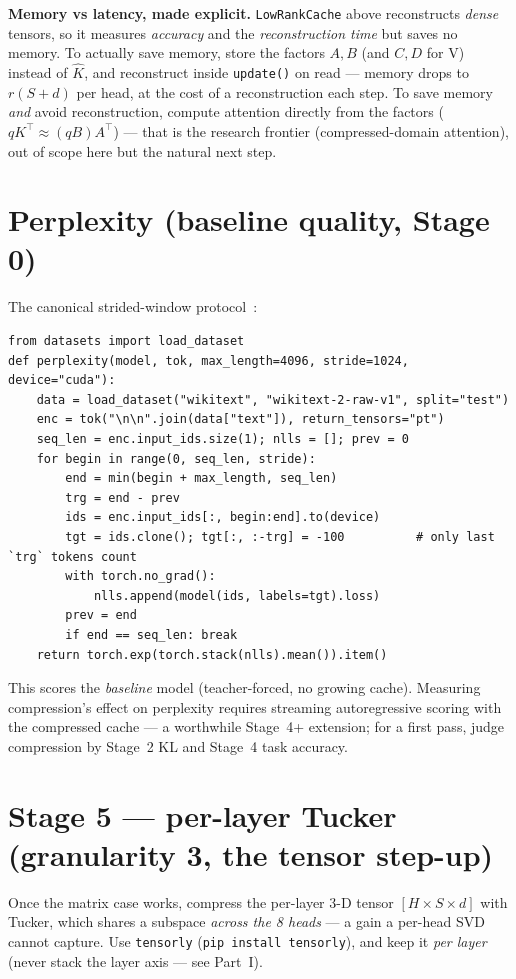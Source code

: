 \documentclass[11pt]{article}
\newcommand{\code}[1]{\texttt{\small #1}}
\begin{document}
\begin{tipbox}
\textbf{Memory vs latency, made explicit.} \code{LowRankCache} above reconstructs \emph{dense}
tensors, so it measures \emph{accuracy} and the \emph{reconstruction time} but saves no memory. To
actually save memory, store the factors $A,B$ (and $C,D$ for V) instead of $\hat K$, and
reconstruct inside \code{update()} on read --- memory drops to $r(S+d)$ per head, at the cost of a
reconstruction each step. To save memory \emph{and} avoid reconstruction, compute attention
directly from the factors ($qK^\top\!\approx (qB)A^\top$) --- that is the research frontier
(compressed-domain attention), out of scope here but the natural next step.
\end{tipbox}

\section{Perplexity (baseline quality, Stage 0)}
The canonical strided-window protocol~\cite{hfppl}:
\begin{lstlisting}
from datasets import load_dataset
def perplexity(model, tok, max_length=4096, stride=1024, device="cuda"):
    data = load_dataset("wikitext", "wikitext-2-raw-v1", split="test")
    enc = tok("\n\n".join(data["text"]), return_tensors="pt")
    seq_len = enc.input_ids.size(1); nlls = []; prev = 0
    for begin in range(0, seq_len, stride):
        end = min(begin + max_length, seq_len)
        trg = end - prev
        ids = enc.input_ids[:, begin:end].to(device)
        tgt = ids.clone(); tgt[:, :-trg] = -100          # only last `trg` tokens count
        with torch.no_grad():
            nlls.append(model(ids, labels=tgt).loss)
        prev = end
        if end == seq_len: break
    return torch.exp(torch.stack(nlls).mean()).item()
\end{lstlisting}
This scores the \emph{baseline} model (teacher-forced, no growing cache). Measuring compression's
effect on perplexity requires streaming autoregressive scoring with the compressed cache --- a
worthwhile Stage~4+ extension; for a first pass, judge compression by Stage~2 KL and Stage~4 task
accuracy.

\section{Stage 5 --- per-layer Tucker (granularity 3, the tensor step-up)}
Once the matrix case works, compress the per-layer 3-D tensor $[H\times S\times d]$ with Tucker,
which shares a subspace \emph{across the 8 heads} --- a gain a per-head SVD cannot capture. Use
\code{tensorly} (\code{pip install tensorly}), and keep it \emph{per layer} (never stack the layer
axis --- see Part~I).
\end{document}
